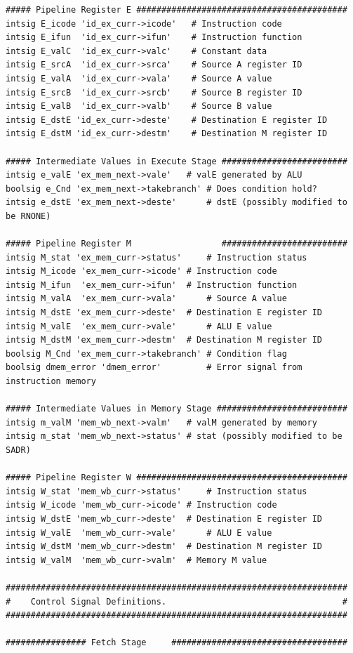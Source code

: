 \documentclass{article}
\begin{document}
\begin{lstlisting}[numberstyle=\scriptsize, basicstyle=\scriptsize]
##### Pipeline Register E ##########################################
intsig E_icode 'id_ex_curr->icode'   # Instruction code
intsig E_ifun  'id_ex_curr->ifun'    # Instruction function
intsig E_valC  'id_ex_curr->valc'    # Constant data
intsig E_srcA  'id_ex_curr->srca'    # Source A register ID
intsig E_valA  'id_ex_curr->vala'    # Source A value
intsig E_srcB  'id_ex_curr->srcb'    # Source B register ID
intsig E_valB  'id_ex_curr->valb'    # Source B value
intsig E_dstE 'id_ex_curr->deste'    # Destination E register ID
intsig E_dstM 'id_ex_curr->destm'    # Destination M register ID

##### Intermediate Values in Execute Stage #########################
intsig e_valE 'ex_mem_next->vale'	# valE generated by ALU
boolsig e_Cnd 'ex_mem_next->takebranch' # Does condition hold?
intsig e_dstE 'ex_mem_next->deste'      # dstE (possibly modified to be RNONE)

##### Pipeline Register M                  #########################
intsig M_stat 'ex_mem_curr->status'     # Instruction status
intsig M_icode 'ex_mem_curr->icode'	# Instruction code
intsig M_ifun  'ex_mem_curr->ifun'	# Instruction function
intsig M_valA  'ex_mem_curr->vala'      # Source A value
intsig M_dstE 'ex_mem_curr->deste'	# Destination E register ID
intsig M_valE  'ex_mem_curr->vale'      # ALU E value
intsig M_dstM 'ex_mem_curr->destm'	# Destination M register ID
boolsig M_Cnd 'ex_mem_curr->takebranch'	# Condition flag
boolsig dmem_error 'dmem_error'	        # Error signal from instruction memory

##### Intermediate Values in Memory Stage ##########################
intsig m_valM 'mem_wb_next->valm'	# valM generated by memory
intsig m_stat 'mem_wb_next->status'	# stat (possibly modified to be SADR)

##### Pipeline Register W ##########################################
intsig W_stat 'mem_wb_curr->status'     # Instruction status
intsig W_icode 'mem_wb_curr->icode'	# Instruction code
intsig W_dstE 'mem_wb_curr->deste'	# Destination E register ID
intsig W_valE  'mem_wb_curr->vale'      # ALU E value
intsig W_dstM 'mem_wb_curr->destm'	# Destination M register ID
intsig W_valM  'mem_wb_curr->valm'	# Memory M value

####################################################################
#    Control Signal Definitions.                                   #
####################################################################

################ Fetch Stage     ###################################


\end{lstlisting}
\end{document}
